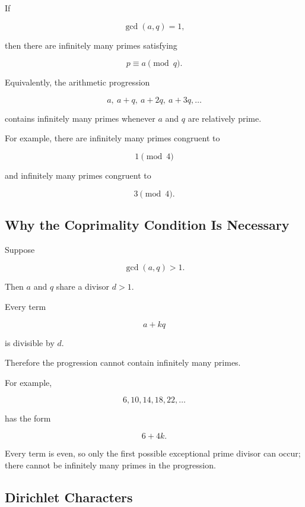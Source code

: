 \begin{theorem}
If

\[ \gcd(a,q)=1, \]

then there are infinitely many primes satisfying

\[ p\equiv a\pmod q. \]
\end{theorem}

Equivalently, the arithmetic progression

\[ a,\ a+q,\ a+2q,\ a+3q,\ldots \]

contains infinitely many primes whenever \(a\) and \(q\) are relatively
prime.

For example, there are infinitely many primes congruent to

\[ 1\pmod4 \]

and infinitely many primes congruent to

\[ 3\pmod4. \]

\subsection{Why the Coprimality Condition Is Necessary}
\label{subsec:dirichlet-coprimality-condition}

Suppose

\[ \gcd(a,q)>1. \]

Then \(a\) and \(q\) share a divisor \(d>1\).

Every term

\[ a+kq \]

is divisible by \(d\).

Therefore the progression cannot contain infinitely many primes.

For example,

\[ 6,10,14,18,22,\ldots \]

has the form

\[ 6+4k. \]

Every term is even, so only the first possible exceptional prime divisor can
occur; there cannot be infinitely many primes in the progression.

\subsection{Dirichlet Characters}
\label{subsec:dirichlet-characters}

